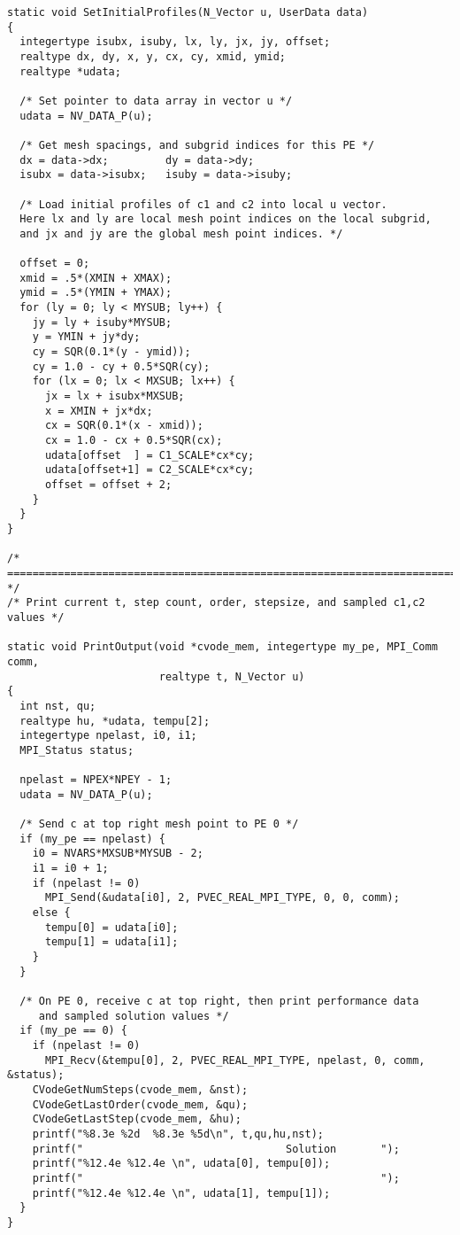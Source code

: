 \begin{verbatim}
static void SetInitialProfiles(N_Vector u, UserData data)
{
  integertype isubx, isuby, lx, ly, jx, jy, offset;
  realtype dx, dy, x, y, cx, cy, xmid, ymid;
  realtype *udata;

  /* Set pointer to data array in vector u */
  udata = NV_DATA_P(u);

  /* Get mesh spacings, and subgrid indices for this PE */
  dx = data->dx;         dy = data->dy;
  isubx = data->isubx;   isuby = data->isuby;

  /* Load initial profiles of c1 and c2 into local u vector.
  Here lx and ly are local mesh point indices on the local subgrid,
  and jx and jy are the global mesh point indices. */

  offset = 0;
  xmid = .5*(XMIN + XMAX);
  ymid = .5*(YMIN + YMAX);
  for (ly = 0; ly < MYSUB; ly++) {
    jy = ly + isuby*MYSUB;
    y = YMIN + jy*dy;
    cy = SQR(0.1*(y - ymid));
    cy = 1.0 - cy + 0.5*SQR(cy);
    for (lx = 0; lx < MXSUB; lx++) {
      jx = lx + isubx*MXSUB;
      x = XMIN + jx*dx;
      cx = SQR(0.1*(x - xmid));
      cx = 1.0 - cx + 0.5*SQR(cx);
      udata[offset  ] = C1_SCALE*cx*cy; 
      udata[offset+1] = C2_SCALE*cx*cy;
      offset = offset + 2;
    }
  }
}

/* ======================================================================= */
/* Print current t, step count, order, stepsize, and sampled c1,c2 values */

static void PrintOutput(void *cvode_mem, integertype my_pe, MPI_Comm comm,
                        realtype t, N_Vector u)
{
  int nst, qu;
  realtype hu, *udata, tempu[2];
  integertype npelast, i0, i1;
  MPI_Status status;

  npelast = NPEX*NPEY - 1;
  udata = NV_DATA_P(u);

  /* Send c at top right mesh point to PE 0 */
  if (my_pe == npelast) {
    i0 = NVARS*MXSUB*MYSUB - 2;
    i1 = i0 + 1;
    if (npelast != 0)
      MPI_Send(&udata[i0], 2, PVEC_REAL_MPI_TYPE, 0, 0, comm);
    else {
      tempu[0] = udata[i0];
      tempu[1] = udata[i1];
    }
  }

  /* On PE 0, receive c at top right, then print performance data
     and sampled solution values */ 
  if (my_pe == 0) {
    if (npelast != 0)
      MPI_Recv(&tempu[0], 2, PVEC_REAL_MPI_TYPE, npelast, 0, comm, &status);
    CVodeGetNumSteps(cvode_mem, &nst);
    CVodeGetLastOrder(cvode_mem, &qu);
    CVodeGetLastStep(cvode_mem, &hu);
    printf("%8.3e %2d  %8.3e %5d\n", t,qu,hu,nst);
    printf("                                Solution       ");
    printf("%12.4e %12.4e \n", udata[0], tempu[0]); 
    printf("                                               ");
    printf("%12.4e %12.4e \n", udata[1], tempu[1]);
  }
}


\end{verbatim}
